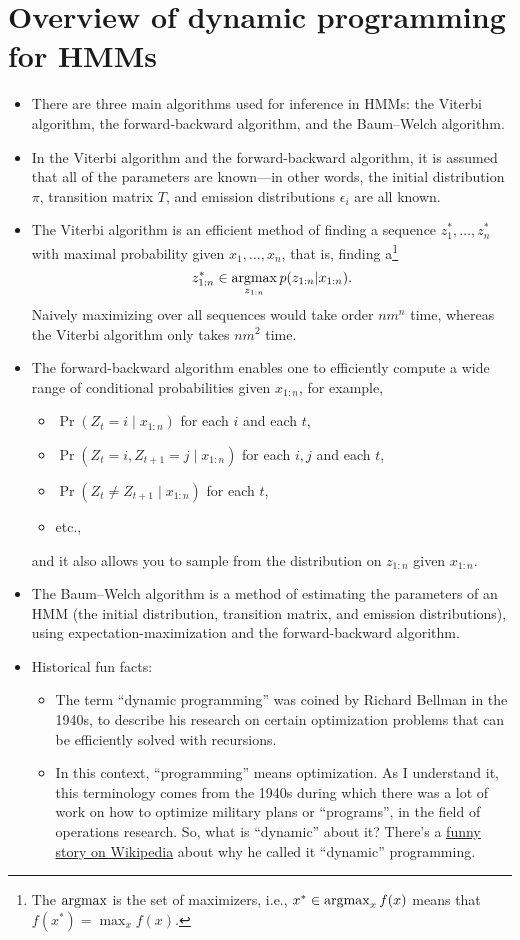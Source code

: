 \documentclass[12pt]{article}
\begin{document}
\section{Overview of dynamic programming for HMMs}

\begin{itemize}
\item There are three main algorithms used for inference in HMMs: the Viterbi algorithm, the forward-backward algorithm, and the Baum--Welch algorithm.
\item In the Viterbi algorithm and the forward-backward algorithm, it is assumed that all of the parameters are known---in other words, the initial distribution $\pi$, transition matrix $T$, and emission distributions $\epsilon_i$ are all known.
\item The Viterbi algorithm is an efficient method of finding a sequence $z_1^*,\ldots,z_n^*$ with maximal probability given $x_1,\ldots,x_n$, that is, finding a\footnote{The $\operatorname*{argmax}$ is the set of maximizers, i.e., $x^* \in \operatorname*{argmax}_x f(x)$ means that $f(x^*) = \max_x f(x)$.}
$$ z_{1:n}^* \in \operatorname*{argmax}_{z_{1:n}} p(z_{1:n} | x_{1:n}). $$
Naively maximizing over all sequences would take order $n m^n$ time, whereas the Viterbi algorithm only takes $n m^2$ time.
\item The forward-backward algorithm enables one to efficiently compute a wide range of conditional probabilities given $x_{1:n}$, for example,
\begin{itemize}
\item $\Pr(Z_t = i \mid x_{1:n})$ for each $i$ and each $t$,
\item $\Pr(Z_t = i, Z_{t+1}=j \mid x_{1:n})$ for each $i,j$ and each $t$,
\item $\Pr(Z_t \neq Z_{t+1} \mid x_{1:n})$ for each $t$,
\item etc.,
\end{itemize}
and it also allows you to sample from the distribution on $z_{1:n}$ given $x_{1:n}$.
\item The Baum--Welch algorithm is a method of estimating the parameters of an HMM (the initial distribution, transition matrix, and emission distributions), using expectation-maximization and the forward-backward algorithm.
\item Historical fun facts:
\begin{itemize}
\item The term ``dynamic programming'' was coined by Richard Bellman in the 1940s, to describe his research on certain optimization problems that can be efficiently solved with recursions.
\item In this context, ``programming'' means optimization. As I understand it, this terminology comes from the 1940s during which there was a lot of work on how to optimize military plans or ``programs'', in the field of operations research. So, what is ``dynamic'' about it? There's a \href{https://en.wikipedia.org/wiki/Dynamic_programming#History}{funny story on Wikipedia} about why he called it ``dynamic'' programming.
\end{itemize}
\end{itemize}
\end{document}
